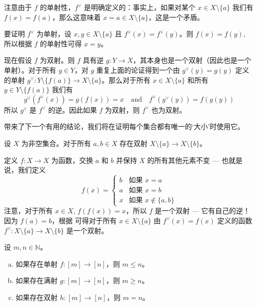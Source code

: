 \begin{cproof}
注意由于 $f$ 的单射性，$f^{\vee}$ 是明确定义的：事实上，如果对某个 $x \in X \setminus \{ a \}$ 我们有 $f(x) = f(a)$，那么这意味着 $x=a \in X \setminus \{ a \} $，这是一个矛盾。

要证明 $f^{\vee}$ 为单射，设 $x,y \in X \setminus \{ a \}$ 且 $f^{\vee}(x) = f^{\vee}(y)$。则 $f(x) = f(y)$, 所以根据 $f$ 的单射性可得 $x=y$。

现在假设 $f$ 为双射。则 $f$ 具有逆 $g : Y \to X$，其本身也是一个双射（因此也是一个单射）。对于所有 $y \in Y$，对 $g$ 重复上面的论证得到一个由 $g^{\vee}(y) = g(y)$ 定义的单射 $g^{\vee} : Y \setminus \{ f(a) \} \to X \setminus \{ a \}$。那么对于所有 $x \in X \setminus \{ a \}$ 和所有 $y \in Y \setminus \{ f(a) \}$ 我们有
\[ g^{\vee}(f^{\vee}(x)) = g(f(x)) = x \quad \text{and} \quad f^{\vee}(g^{\vee}(y)) = f(g(y)) \]
所以 $g^{\vee}$ 是 $f^{\vee}$ 的逆。因此如果 $f$ 为双射，则 $f^{\vee}$ 也为双射。
\end{cproof}

 带来了下一个有用的结论，我们将在证明每个集合都有唯一的`大小'时使用它。

\begin{lemma}
\label{lemRemoveElementFromSet}
设 $X$ 为非空集合。对于所有 $a, b \in X$ 存在双射 $X \setminus \{ a \} \to X \setminus \{ b \}$。
\end{lemma}

\begin{cproof}
定义 $f : X \to X$ 为函数，交换 $a$ 和 $b$ 并保持 $X$ 的所有其他元素不变 --- 也就是说，我们定义
\[ f(x) = \begin{cases} b & \text{如果 } x = a \\ a & \text{如果 } x = b \\ x & \text{如果 } x \not\in \{ a, b \} \end{cases} \]
注意，对于所有 $x \in X$, $f(f(x)) = x$，所以 $f$ 是一个双射 --- 它有自己的逆！因为 $f(a) = b$，根据  可得对于所有 $x \in X \setminus \{ a \}$ 由 $f^{\vee}(x) = f(x)$ 定义的函数 $f^{\vee} : X \setminus \{ a \} \to X \setminus \{ b \}$ 是一个双射。
\end{cproof}

\begin{theorem}
\label{thmJectionsAndSizeOfNaturalNumbers}
设 $m,n \in \mathbb{N}$。
\begin{enumerate}[(a)]
\item 如果存在单射 $f : [m] \to [n]$，则 $m \le n$。
\item 如果存在满射 $g : [m] \to [n]$，则 $m \ge n$。
\item 如果存在双射 $h : [m] \to [n]$，则 $m=n$。
\end{enumerate}
\end{theorem}

